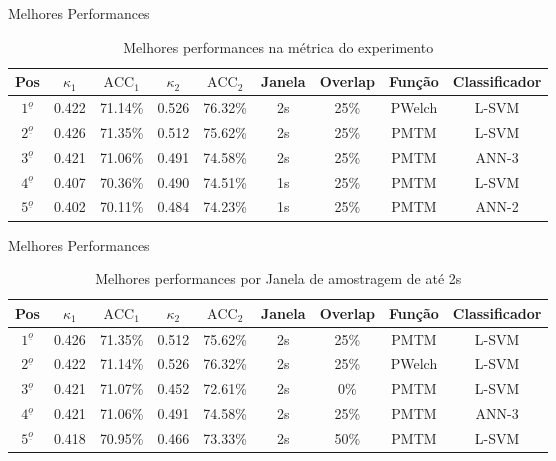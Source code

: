 \documentclass{beamer}
\begin{document}
\begin{frame}{Melhores Performances}
\color{black}
 \centering%
    \begin{table}[h!]
	\caption{Melhores performances na m\'etrica do experimento}
	\scriptsize
	\begin{tabularx}{\textwidth}{c|c|c|c|c|c|c|c|c}
		\hline\hline
		Pos&$\kappa_1$ &$\text{ACC}_1$&$\kappa_2$&$\text{ACC}_2$&Janela& Overlap&Fun\c{c}\~ao&Classificador  \\ \hline 
		$1^{\underline{o}}$&0.422&71.14\%&0.526&76.32\%&2s&25\%&PWelch&\acs{L-SVM} \\ \hline 
		$2^{\underline{o}}$&0.426&71.35\%&0.512&75.62\%&2s&25\%&PMTM&L-SVM \\ \hline
		$3^{\underline{o}}$&0.421&71.06\%&0.491&74.58\%&2s&25\%&PMTM&\acs{ANN-3} \\ \hline
		$4^{\underline{o}}$&0.407&70.36\%&0.490&74.51\%&1s&25\%&PMTM&L-SVM \\ \hline
		$5^{\underline{o}}$&0.402&70.11\%&0.484&74.23\%&1s&25\%&PMTM&\ac{ANN-2} \\ \hline
	\end{tabularx}
	
	\label{Tab:melhoresKappaFull}
\end{table}
\end{frame}
\begin{frame}{Melhores Performances}
\color{black}
\centering

\begin{table}[h!]

	\caption{Melhores performances por Janela de amostragem de at\'e 2s}
	\scriptsize
	\begin{tabularx}{\textwidth}{c|c|c|c|c|c|c|c|c}		
		\hline\hline
		Pos&$\kappa_1$ &$\text{ACC}_1$&$\kappa_2$&$\text{ACC}_2$&Janela& Overlap&Fun\c{c}\~ao&Classificador  \\ \hline
		$1^{\underline{o}}$&0.426&71.35\%&0.512&75.62\%&2s&25\%&PMTM&L-SVM \\ \hline 
		$2^{\underline{o}}$&0.422&71.14\%&0.526&76.32\%&2s&25\%&PWelch&L-SVM\\ \hline
		$3^{\underline{o}}$&0.421&71.07\%&0.452&72.61\%&2s&0\%&PMTM&L-SVM \\ \hline
		$4^{\underline{o}}$&0.421&71.06\%&0.491&74.58\%&2s&25\%&PMTM&ANN-3 \\ \hline
		$5^{\underline{o}}$&0.418&70.95\%&0.466&73.33\%&2s&50\%&PMTM&L-SVM \\ \hline
	\end{tabularx}
	\label{Tab:melhoresKappa}

\end{table}

\end{frame}
\end{document}
